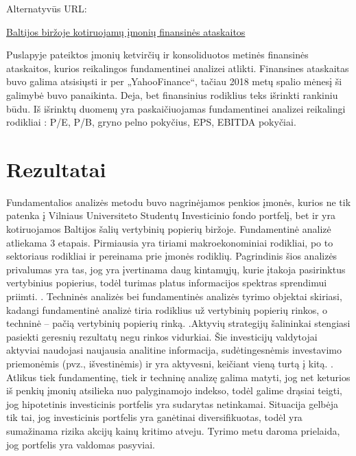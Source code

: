 \documentclass[12pt]{article}
\begin{document}
Alternatyvūs URL:

\href{https://www.nasdaqbaltic.com/market/?pg=reports&lang=lt}{Baltijos biržoje kotiruojamų įmonių finansinės ataskaitos}

Puslapyje pateiktos įmonių ketvirčių ir konsoliduotos metinės finansinės ataskaitos, kurios reikalingos fundamentinei analizei atlikti. Finansines ataskaitas buvo galima atsisiųsti ir per „YahooFinance“, tačiau 2018 metų spalio mėnesį ši galimybė buvo panaikinta. Deja, bet finansinius rodiklius teks išrinkti rankiniu būdu. Iš išrinktų duomenų yra paskaičiuojamas fundamentinei analizei reikalingi rodikliai : P/E, P/B, gryno pelno pokyčius, EPS, EBITDA pokyčiai.
\newpage
\section{Rezultatai}
Fundamentalios analizės metodu buvo nagrinėjamos penkios įmonės, kurios ne tik patenka į Vilniaus Universiteto Studentų Investicinio fondo portfelį, bet ir yra kotiruojamos Baltijos šalių vertybinių popierių biržoje. Fundamentinė analizė atliekama 3 etapais. Pirmiausia yra tiriami makroekonominiai rodikliai, po to sektoriaus rodikliai ir pereinama prie įmonės rodiklių. Pagrindinis šios analizės privalumas yra tas, jog yra įvertinama daug kintamųjų, kurie įtakoja pasirinktus vertybinius popierius, todėl turimas platus informacijos spektras sprendimui priimti. \cite{klavcok2018fundamentines}. Techninės analizės bei fundamentinės analizės tyrimo objektai skiriasi, kadangi fundamentinė analizė tiria rodiklius už vertybinių popierių rinkos, o techninė – pačią vertybinių popierių rinką. \cite{klavcok2018fundamentines}.Aktyvių strategijų šalininkai stengiasi pasiekti geresnių rezultatų negu rinkos vidurkiai. Šie investicijų valdytojai aktyviai naudojasi naujausia analitine informacija, sudėtingesnėmis investavimo priemonėmis (pvz., išvestinėmis) ir yra aktyvesni, keičiant vieną turtą į kitą. \cite{kalinauskas2003investicijku}. Atlikus tiek fundamentinę, tiek ir techninę analizę galima matyti, jog net keturios iš penkių įmonių atsilieka nuo palyginamojo indekso, todėl galime drąsiai teigti, jog hipotetinis investicinis portfelis yra sudarytas netinkamai. Situacija gelbėja tik tai, jog investicinis portfelis yra ganėtinai diversifikuotas, todėl yra sumažinama rizika akcijų kainų kritimo atveju. Tyrimo metu daroma prielaida, jog portfelis yra valdomas pasyviai.
\end{document}
